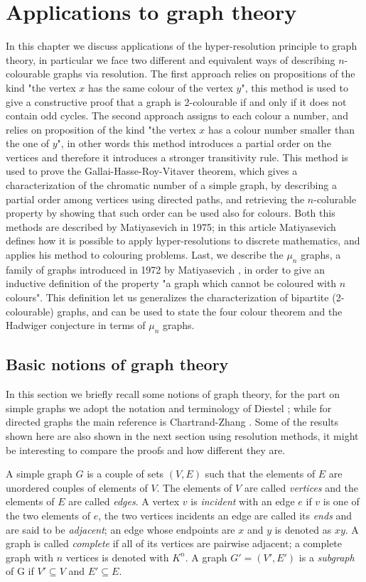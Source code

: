 \documentclass[a4paper,12pt,oneside]{book}
\begin{document}
\chapter{Applications to graph theory}
In this chapter we discuss applications of the hyper-resolution principle to graph theory, in particular we  face two different and equivalent ways of describing $n$-colourable graphs via resolution. The first approach relies on propositions of the kind "the vertex $x$ has the same colour of the vertex $y$", this method is used to give a constructive proof that a graph is 2-colourable if and only if it does not contain odd cycles. The second approach assigns to each colour a number, and relies on proposition of the kind "the vertex $x$ has a colour number smaller than the one of $y$", in other words this method introduces a partial order on the vertices and therefore it introduces a stronger transitivity rule. This method is used to prove the Gallai-Hasse-Roy-Vitaver theorem, which gives a characterization of the chromatic number of a simple graph, by describing a partial order among vertices using directed paths, and retrieving the $n$-colurable property by showing that such order can be used also for colours. 
Both this methods are described by Matiyasevich in 1975\cite{mat-1}; in this article Matiyasevich defines how it is possible to apply hyper-resolutions to discrete mathematics, and applies his method to colouring problems.
Last, we describe the $\mu_n$ graphs, a family of graphs introduced in 1972 by Matiyasevich \cite{mat-2}, in order to give an inductive definition of the property "a graph which cannot be coloured with $n$ colours". This definition let us generalizes the characterization of bipartite (2-colourable) graphs, and can be used to state the four colour theorem and the Hadwiger conjecture in terms of $\mu_n$ graphs.


\section{Basic notions of graph theory}

In this section we briefly recall some notions of graph theory, for the part on simple graphs we adopt the notation and terminology of Diestel \cite{diestel}; while for directed graphs the main reference is Chartrand-Zhang \cite{chrom}. Some of the results shown here are also shown in the next section using resolution methods, it might be interesting to compare the proofs and how different they are.

A simple graph $G$ is a couple of sets $(V,E)$ such that the elements of $E$ are unordered couples of elements of $V$. The elements of $V$ are called \textit{vertices} and the elements of $E$ are called \textit{edges}. A vertex $v$ is \textit{incident} with an edge $e$ if $v$ is one of the two elements of $e$, the two vertices incidents an edge are called its \textit{ends} and are said to be \textit{adjacent}; an edge whose endpoints are $x$ and $y$ is denoted as $xy$. A graph is called  \textit{complete} if all of its vertices are pairwise adjacent; a complete graph with $n$ vertices is denoted with $K^n$.
A graph $G'=(V',E')$ is a \textit{subgraph} of G if $V' \subseteq V$ and $E' \subseteq E$.
\end{document}
